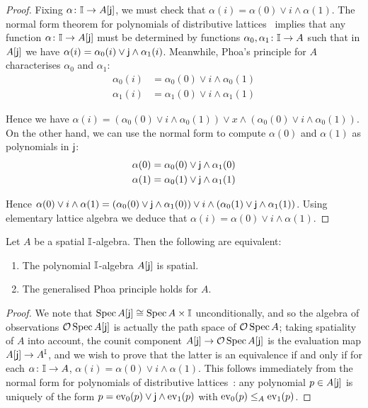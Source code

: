\begin{proof}
  Fixing $\alpha\colon \mathbb{I}\to A[\mathsf{j}]$, we must check that $\alpha(i) = \alpha(0) \vee i \wedge \alpha(1)$. 
  The normal form theorem for polynomials of distributive lattices~\citep[Ch.\ 1, Thm.\ 10.11]{lausch2000algebra} implies that any function $\alpha\colon \mathbb{I}\to A[\mathsf{j}]$ must be determined by functions $\alpha_0,\alpha_1\colon \mathbb{I}\to A$ such that in $A[\mathsf{j}]$ we have $\alpha(i) = \alpha_0(i)\vee \mathsf{j} \wedge \alpha_1(i)$. Meanwhile, Phoa's principle for $A$ characterises $\alpha_0$ and $\alpha_1$:
  \begin{align*}
    \alpha_0(i) &= \alpha_0(0) \vee i \wedge \alpha_0(1)
    \\ 
    \alpha_1(i) &= \alpha_1(0) \vee i \wedge \alpha_1(1)
  \end{align*}

  Hence we have $\alpha(i) = (\alpha_0(0) \vee i \wedge \alpha_0(1))\lor x \wedge (\alpha_0(0) \vee i \wedge \alpha_0(1))$. On the other hand, we can use the normal form to compute $\alpha(0)$ and $\alpha(1)$ as polynomials in $\mathsf{j}$: 
  \begin{align*}
    \alpha(0) &= \alpha_0(0) \vee \mathsf{j}\wedge \alpha_1(0)\\
    \alpha(1) &= \alpha_0(1) \vee \mathsf{j}\wedge \alpha_1(1)
  \end{align*}

  Hence $\alpha(0)\lor i \wedge \alpha(1) = (\alpha_0(0) \vee \mathsf{j}\wedge \alpha_1(0))\vee i \wedge (\alpha_0(1) \vee \mathsf{j}\wedge \alpha_1(1))$. Using elementary lattice algebra we deduce that $\alpha(i) = \alpha(0) \vee i \wedge \alpha(1)$.
\end{proof}

\begin{theorem}\label{obs:sqcp-phoa-gen}
  Let $A$ be a spatial $\mathbb{I}$-algebra. Then the following are equivalent:
  \begin{enumerate}
    \item The polynomial $\mathbb{I}$-algebra $A[\mathsf{j}]$ is spatial.
    \item The generalised Phoa principle holds for $A$.
  \end{enumerate}
\end{theorem}

\begin{proof}
  We note that $\operatorname{Spec}{A[\mathsf{j}]} \cong \operatorname{Spec}{A}\times \mathbb{I}$ unconditionally, and so the algebra of observations $\mathcal{O}\operatorname{Spec}{A[\mathsf{j}]}$ is actually the path space of $\mathcal{O}\operatorname{Spec}{A}$; taking spatiality of $A$ into account, the counit component $A[\mathsf{j}]\to \mathcal{O}\operatorname{Spec} A[\mathsf{j}]$ is the evaluation map $A[\mathsf{j}] \to A^{\mathbb{I}}$, and we wish to prove that the latter is an equivalence if and only if for each $\alpha\colon \mathbb{I}\to A$, $\alpha(i)=\alpha(0)\vee i\wedge\alpha(1)$. 
  This follows immediately from the normal form for polynomials of distributive lattices~\citep[Ch.\ 1, Thm.\ 10.11]{lausch2000algebra}: any polynomial $p\in A[\mathsf{j}]$ is uniquely of the form $p = \mathrm{ev}_0(p) \vee \mathsf{j} \wedge \mathrm{ev}_1(p)$ with $\mathrm{ev}_0(p)\le_A \mathrm{ev}_1(p)$.
\end{proof}


